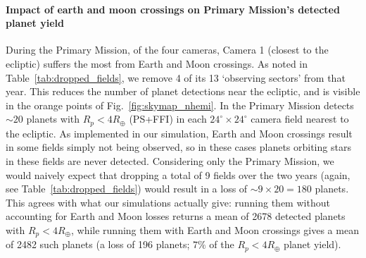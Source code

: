 \paragraph{Impact of earth and moon crossings on Primary Mission's detected planet yield}
During the Primary Mission, of the four cameras, Camera 1 (closest to the 
ecliptic) suffers the most from Earth and Moon crossings.
As noted in Table~\ref{tab:dropped_fields}, we remove 4 of its 13 
`observing sectors' from that year.
This reduces the number of planet detections near the ecliptic, and is visible in the orange points of Fig.~\ref{fig:skymap_nhemi}.
In the Primary Mission \tess detects $\sim20$ planets with $R_p<4R_\oplus$ 
(PS+FFI) in each $24^\circ\times24^\circ$ camera field nearest to the ecliptic.
As implemented in our simulation, Earth and Moon crossings result in some 
fields simply not being observed, so in these cases planets orbiting stars in 
these fields are never detected.
Considering only the Primary Mission, we would naively expect that dropping a total of 9 fields over the two years (again, see Table~\ref{tab:dropped_fields}) would result in a loss of $\sim9\times20=180$ planets.
This agrees with what our simulations actually give: running them without accounting for Earth and Moon losses returns a mean of 2678 detected planets with $R_p<4R_\oplus$, while running them with Earth and Moon crossings gives a mean of 2482 such planets (a loss of 196 planets; $7\%$ of the $R_p<4R_\oplus$ planet yield).
